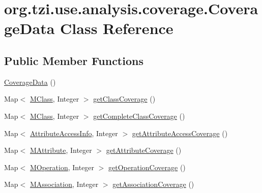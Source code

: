 \hypertarget{classorg_1_1tzi_1_1use_1_1analysis_1_1coverage_1_1_coverage_data}{\section{org.\-tzi.\-use.\-analysis.\-coverage.\-Coverage\-Data Class Reference}
\label{classorg_1_1tzi_1_1use_1_1analysis_1_1coverage_1_1_coverage_data}
}
\subsection*{Public Member Functions}
\begin{DoxyCompactItemize}
\item 
\hyperlink{classorg_1_1tzi_1_1use_1_1analysis_1_1coverage_1_1_coverage_data_adc049e30d0a0807d4f1ce0eaaccf5510}{Coverage\-Data} ()
\item 
Map$<$ \hyperlink{interfaceorg_1_1tzi_1_1use_1_1uml_1_1mm_1_1_m_class}{M\-Class}, Integer $>$ \hyperlink{classorg_1_1tzi_1_1use_1_1analysis_1_1coverage_1_1_coverage_data_ae2bbbdffacb4f49f3beac1f109e85e53}{get\-Class\-Coverage} ()
\item 
Map$<$ \hyperlink{interfaceorg_1_1tzi_1_1use_1_1uml_1_1mm_1_1_m_class}{M\-Class}, Integer $>$ \hyperlink{classorg_1_1tzi_1_1use_1_1analysis_1_1coverage_1_1_coverage_data_adbd005e49e3db6e7857a162031d8543b}{get\-Complete\-Class\-Coverage} ()
\item 
Map$<$ \hyperlink{classorg_1_1tzi_1_1use_1_1analysis_1_1coverage_1_1_attribute_access_info}{Attribute\-Access\-Info}, Integer $>$ \hyperlink{classorg_1_1tzi_1_1use_1_1analysis_1_1coverage_1_1_coverage_data_abbc3525c28fa61c04085554065aa5807}{get\-Attribute\-Access\-Coverage} ()
\item 
Map$<$ \hyperlink{classorg_1_1tzi_1_1use_1_1uml_1_1mm_1_1_m_attribute}{M\-Attribute}, Integer $>$ \hyperlink{classorg_1_1tzi_1_1use_1_1analysis_1_1coverage_1_1_coverage_data_a495a99d61c12fc3c324c1340fa32af40}{get\-Attribute\-Coverage} ()
\item 
Map$<$ \hyperlink{classorg_1_1tzi_1_1use_1_1uml_1_1mm_1_1_m_operation}{M\-Operation}, Integer $>$ \hyperlink{classorg_1_1tzi_1_1use_1_1analysis_1_1coverage_1_1_coverage_data_afff5368dcb30d26b79a627da5131d0b4}{get\-Operation\-Coverage} ()
\item 
Map$<$ \hyperlink{interfaceorg_1_1tzi_1_1use_1_1uml_1_1mm_1_1_m_association}{M\-Association}, Integer $>$ \hyperlink{classorg_1_1tzi_1_1use_1_1analysis_1_1coverage_1_1_coverage_data_a3cb54d6421f43f16bf498c3427bf574b}{get\-Association\-Coverage} ()

\end{DoxyCompactItemize}
